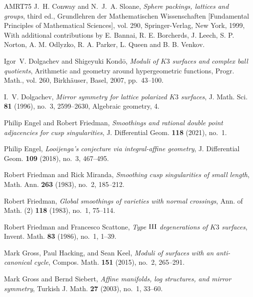 \documentclass{amsart}
\begin{document}
\begin{thebibliography}{AMRT75}
J.~H. Conway and N.~J.~A. Sloane, \emph{Sphere packings, lattices and groups},
  third ed., Grundlehren der Mathematischen Wissenschaften [Fundamental
  Principles of Mathematical Sciences], vol. 290, Springer-Verlag, New York,
  1999, With additional contributions by E. Bannai, R. E. Borcherds, J. Leech,
  S. P. Norton, A. M. Odlyzko, R. A. Parker, L. Queen and B. B. Venkov.

Igor~V. Dolgachev and Shigeyuki Kond\={o}, \emph{Moduli of {$K3$} surfaces and
  complex ball quotients}, Arithmetic and geometry around hypergeometric
  functions, Progr. Math., vol. 260, Birkh\"{a}user, Basel, 2007, pp.~43--100.

I.~V. Dolgachev, \emph{Mirror symmetry for lattice polarized {$K3$} surfaces},
  J. Math. Sci. \textbf{81} (1996), no.~3, 2599--2630, Algebraic geometry, 4.

Philip Engel and Robert Friedman, \emph{Smoothings and rational double point
  adjacencies for cusp singularities}, J. Differential Geom. \textbf{118}
  (2021), no.~1. 

Philip Engel, \emph{Looijenga's conjecture via integral-affine geometry}, J.
  Differential Geom. \textbf{109} (2018), no.~3, 467--495. 

Robert Friedman and Rick Miranda, \emph{Smoothing cusp singularities of small
  length}, Math. Ann. \textbf{263} (1983), no.~2, 185--212. 

Robert Friedman, \emph{Global smoothings of varieties with normal crossings},
  Ann. of Math. (2) \textbf{118} (1983), no.~1, 75--114. 

Robert Friedman and Francesco Scattone, \emph{Type {${\rm III}$} degenerations
  of {$K3$} surfaces}, Invent. Math. \textbf{83} (1986), no.~1, 1--39.

Mark Gross, Paul Hacking, and Sean Keel, \emph{Moduli of surfaces with an
  anti-canonical cycle}, Compos. Math. \textbf{151} (2015), no.~2, 265--291.

Mark Gross and Bernd Siebert, \emph{Affine manifolds, log structures, and
  mirror symmetry}, Turkish J. Math. \textbf{27} (2003), no.~1, 33--60.


\end{thebibliography}
\end{document}

